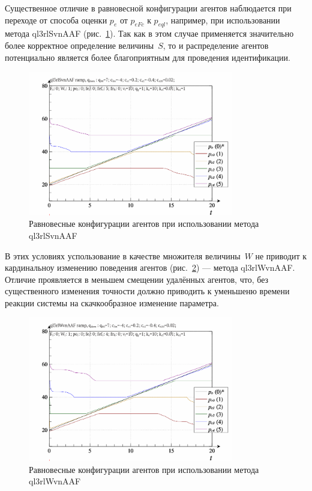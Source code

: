 Существенное отличие в равновесной конфигурации агентов
наблюдается при переходе от способа оценки $p_e$ от $p_{eFc}$ к $p_{eql}$,
например,
при использовании метода ql3rlSvnAAF
(рис.~\ref{atu:f:qls_ramp_ql3rlSvnAAF}).
Так как в этом случае применяется значительно более корректное определение величины~$S$,
то и распределение агентов потенциально является более благоприятным для
проведения идентификации.

\begin{figure}[htb!]
  \begin{center}
    \includegraphics[width=0.8\textwidth]{p/ramp/qls-p_t_pi_ql3rlSvnAAF_ramp.png}
  \end{center}
  \caption{Равновесные конфигурации агентов при использовании метода ql3rlSvnAAF}
  \label{atu:f:qls_ramp_ql3rlSvnAAF}
\end{figure}


В этих условиях успользование в качестве множителя величины~$W$
не приводит к кардинальноу изменению поведения агентов
(рис.~\ref{atu:f:qls_ramp_ql3rlWvnAAF}) --- метода ql3rlWvnAAF.
Отличие проявляется в меньшем смещении удалённых
агентов, что, без существенного изменения точности
должно приводить к уменьшеню времени реакции системы на скачкообразное
изменение параметра.


\begin{figure}[htb!]
  \begin{center}
    \includegraphics[width=0.8\textwidth]{p/ramp/qls-p_t_pi_ql3rlWvnAAF_ramp.png}
  \end{center}
  \caption{Равновесные конфигурации агентов при использовании метода ql3rlWvnAAF}
  \label{atu:f:qls_ramp_ql3rlWvnAAF}
\end{figure}

